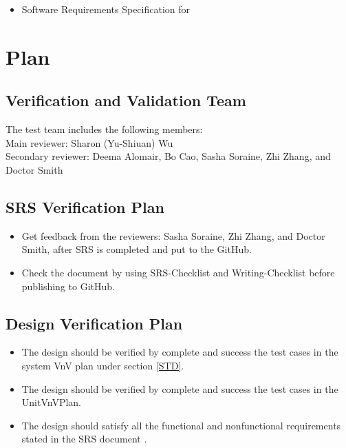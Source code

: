\documentclass[12pt, titlepage]{article}
\begin{document}
\begin{itemize} 
\item Software Requirements Specification for \progname [Wu~\cite{YS2019}] 
 \end{itemize} 

 \section{Plan}	
\subsection{Verification and Validation Team} The test team includes the
following members:\\ 
Main reviewer: Sharon (Yu-Shiuan) Wu\\ 
Secondary reviewer: Deema Alomair, Bo Cao, Sasha Soraine, Zhi Zhang, 
and Doctor Smith\\
\subsection{SRS Verification Plan}

\begin{itemize}

\item Get feedback from the reviewers: Sasha Soraine, Zhi Zhang, and Doctor
Smith, after SRS is completed and put to the GitHub.
\item Check the document by using SRS-Checklist and Writing-Checklist before
publishing to GitHub.

\end{itemize}


\subsection{Design Verification Plan}
\begin{itemize}

\item The design should be verified by complete and success the test cases in
the system VnV plan under section \ref{STD}.
\item The design should be verified by complete and success the test cases in the UnitVnVPlan. 
\item The design should satisfy all the functional and nonfunctional requirements stated in the SRS document \cite{YS2019}.

\end{itemize}
\end{document}
